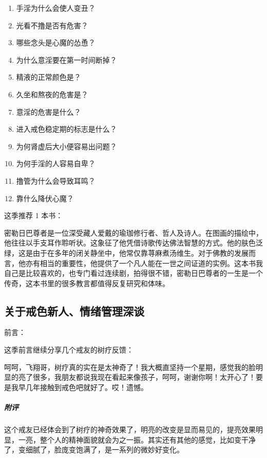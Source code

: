\begin{multicols}{2}
\begin{enumerate}
        \item 手淫为什么会使人变丑？
        \item 光看不撸是否有危害？
        \item 哪些念头是心魔的怂恿？
        \item 为什么意淫要在第一时间断掉？
        \item 精液的正常颜色是？
        \item 久坐和熬夜的危害是？
        \item 意淫的危害是什么？
        \item 进入戒色稳定期的标志是什么？
        \item 为何肾虚后大小便容易出问题？
        \item 为何手淫的人容易自卑？
        \item 撸管为什么会导致耳鸣？
        \item 靠什么降伏心魔？
    \end{enumerate}
\end{multicols}

这季推荐 1 本书：

\begin{book}[《密勒日巴尊者传》]
    密勒日巴尊者是一位深受藏人爱戴的瑜珈修行者、哲人及诗人。在图画的描绘中，他往往以手支耳作聆听状。这象征了他凭借诗歌传达佛法智慧的方式。他的肤色泛绿，这是由于在多年的闭关静坐中，他常仅靠荨麻煮汤维生。对于佛教的发展而言，他亦有相当的重要性，他提供了一个凡人能在一世之间证道的实例。这本书我自己是比较喜欢的，也专门看过连续剧，拍得很不错，密勒日巴尊者的一生是一个传奇，这本书里的很多教言都值得反复研究和体味。
\end{book}

\subsection{关于戒色新人、情绪管理深谈}

前言：

这季前言继续分享几个戒友的树疗反馈：

\begin{case}
    呵呵，飞翔哥，树疗真的实在是太神奇了！我大概直坚持一个星期，感觉我的脸明显的亮了很多，我朋友都说我现在看起来像孩子，呵呵，谢谢你啊！太开心了！要是我早几年接触到戒色吧就好了。哎！遗憾。

    \subparagraph{附评} 这个戒友已经体会到了树疗的神奇效果了，明亮的改变是显而易见的，提亮效果明显，一亮，整个人的精神面貌就会为之一振。其实还有其他的感觉，比如变干净了，变细腻了，脸庞变饱满了，是一系列的微妙好变化。
\end{case}

